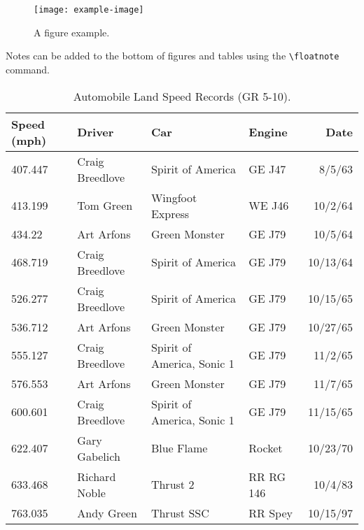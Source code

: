 \documentclass[bibtex,autowc]{apsr_submission}
\begin{document}
\begin{figure}[hbt!]
\texttt{[image: example-image]}
\caption{A figure example.}
\label{fig:view}

\end{figure}


Notes can be added to the bottom of figures and tables using the \verb|\floatnote| command.


\begin{table*}
\caption{Automobile Land Speed Records (GR 5-10).}
\label{tab:wide}

\begin{tabular}{l l l l r}
Speed (mph) & Driver          & Car                        & Engine    & Date     \\
\midrule
407.447     & Craig Breedlove & Spirit of America          & GE J47    & 8/5/63   \\
413.199     & Tom Green       & Wingfoot Express           & WE J46    & 10/2/64  \\
434.22      & Art Arfons      & Green Monster              & GE J79    & 10/5/64  \\
468.719     & Craig Breedlove & Spirit of America          & GE J79    & 10/13/64 \\
526.277     & Craig Breedlove & Spirit of America          & GE J79    & 10/15/65 \\
536.712     & Art Arfons      & Green Monster              & GE J79    & 10/27/65 \\
555.127     & Craig Breedlove & Spirit of America, Sonic 1 & GE J79    & 11/2/65  \\
576.553     & Art Arfons      & Green Monster              & GE J79    & 11/7/65  \\
600.601     & Craig Breedlove & Spirit of America, Sonic 1 & GE J79    & 11/15/65 \\
622.407     & Gary Gabelich   & Blue Flame                 & Rocket    & 10/23/70 \\
633.468     & Richard Noble   & Thrust 2                   & RR RG 146 & 10/4/83  \\
763.035     & Andy Green      & Thrust SSC                 & RR Spey   & 10/15/97\\
\end{tabular}


\end{table*}
\end{document}
